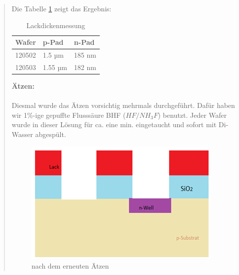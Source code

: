 \begin{quote}
    		\vspace{2em}

    		Die Tabelle \ref{tab:Lackdickenmess} zeigt das Ergebnis:

    		\vspace{2em}

      		\begin{table}[H]
     		  \begin{addmargin}[3cm]{3cm}
     			\centering
                   \begin{tabular}{|p{3cm}|p{3cm}|p{3cm}|}
         			\hline
         			Wafer & p-Pad & n-Pad\\
         			\hline
        			120502 & 1.5 µm     & 185 nm\\
        			\hline
                    120503 & 1.55 µm 	& 182 nm\\
                    \hline

                    \end{tabular}
              \end{addmargin}
              \caption{Lackdickenmessung}
              \label{tab:Lackdickenmess}
            \end{table}

            \vspace{2em}

			\textbf{Ätzen:}\\
			\\
			Diesmal wurde das Ätzen vorsichtig mehrmals durchgeführt. Dafür
			haben wir 1\%-ige gepuffte Flusssäure BHF ($HF/NH_{3}F$) benutzt.
			Jeder Wafer wurde in dieser Lösung für ca. eine min. eingetaucht und
			sofort mit Di-Wasser abgespült.

			\vspace{2em}

    		\begin{figure}[H]
				\hspace{3 cm}
                  \includegraphics[scale=1, trim = 0cm 0cm 0cm 0cm,clip]
                	{./HerstellungBilder/StrukturnachdemAetzen2.png}
                  \caption{nach dem erneuten Ätzen}
                \label{fig:ernAetz}
            \end{figure}


\end{quote}
